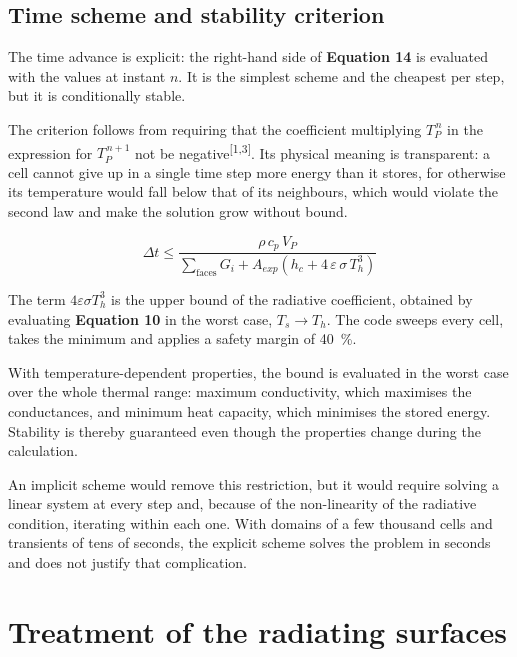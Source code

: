 \documentclass[11pt,a4paper]{article}
\newcommand{\cita}[1]{\textsuperscript{[\textcolor{uji}{#1}]}}
\newcommand{\ecu}[1]{\textbf{\textcolor{uji}{Equation #1}}}
\begin{document}
\subsection{Time scheme and stability criterion}
\label{sec:estabilidad}

The time advance is explicit: the right-hand side of \ecu{14} is evaluated
with the values at instant $n$. It is the simplest scheme and the cheapest
per step, but it is conditionally stable.

The criterion follows from requiring that the coefficient multiplying
$T_{P}^{\,n}$ in the expression for $T_{P}^{\,n+1}$ not be
negative\cita{1,3}. Its physical meaning is transparent: a cell cannot give
up in a single time step more energy than it stores, for otherwise its
temperature would fall below that of its neighbours, which would violate
the second law and make the solution grow without bound.

\begin{equation}
\boxed{\;
\Delta t \leq \frac{\rho\, c_p\, V_{P}}
{\displaystyle\sum_{\text{faces}} G_{i}
+ A_{exp} \left( h_{c} + 4\, \varepsilon\, \sigma\, T_{h}^{3} \right)}
\;}
\end{equation}

The term $4 \varepsilon \sigma T_{h}^{3}$ is the upper bound of the
radiative coefficient, obtained by evaluating \ecu{10} in the worst case,
$T_{s} \to T_{h}$. The code sweeps every cell, takes the minimum and
applies a safety margin of \SI{40}{\percent}.

With temperature-dependent properties, the bound is evaluated in the worst
case over the whole thermal range: maximum conductivity, which maximises
the conductances, and minimum heat capacity, which minimises the stored
energy. Stability is thereby guaranteed even though the properties change
during the calculation.

An implicit scheme would remove this restriction, but it would require
solving a linear system at every step and, because of the non-linearity of
the radiative condition, iterating within each one. With domains of a few
thousand cells and transients of tens of seconds, the explicit scheme
solves the problem in seconds and does not justify that complication.

\section{Treatment of the radiating surfaces}
\label{sec:pared}
\end{document}
